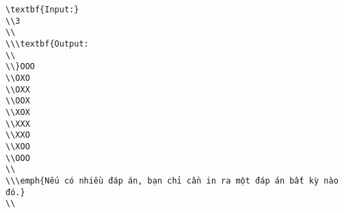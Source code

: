 \begin{verbatim}
\textbf{Input:}
\\3
\\
\\\textbf{Output:
\\
\\}OOO
\\OXO
\\OXX
\\OOX
\\XOX
\\XXX
\\XXO
\\XOO
\\OOO
\\
\\\emph{Nếu có nhiều đáp án, bạn chỉ cần in ra một đáp án bất kỳ nào đó.}
\\\end{verbatim}